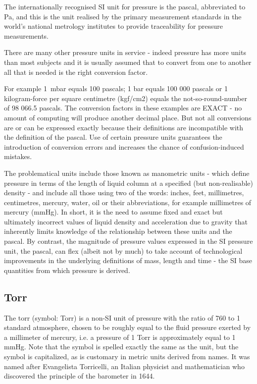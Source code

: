 \documentclass{tufte-book}
\begin{document}
The internationally recognised SI unit for pressure is the pascal, abbreviated to Pa, and this is the unit realised by the primary measurement standards in the world's national metrology institutes to provide traceability for pressure measurements.

There are many other pressure units in service - indeed pressure has more units than most subjects and it is usually assumed that to convert from one to another all that is needed is the right conversion factor. 

For example \SI{1}{mbar} equals 100 pascals; 1 bar equals 100 000 pascals or 1 kilogram-force per square centimetre (kgf/cm2) equals the not-so-round-number of 98 066.5 pascals. The conversion factors in these examples are EXACT - no amount of computing will produce another decimal place. But not all conversions are or can be expressed exactly because their definitions are incompatible with the definition of the pascal. Use of certain pressure units guarantees the introduction of conversion errors and increases the chance of confusion-induced mistakes.



The problematical units include those known as manometric units - which define pressure in terms of the length of liquid column at a specified (but non-realisable) density - and include all those using two of the words: inches, feet, millimetres, centimetres, mercury, water, oil or their abbreviations, for example millimetres of mercury (mmHg). In short, it is the need to assume fixed and exact but ultimately incorrect values of liquid density and acceleration due to gravity that inherently limits knowledge of the relationship between these units and the pascal. By contrast, the magnitude of pressure values expressed in the SI pressure unit, the pascal, can flex (albeit not by much) to take account of technological improvements in the underlying definitions of mass, length and time - the SI base quantities from which pressure is derived.




\subsection{Torr}

The torr (symbol: Torr) is a non-SI unit of pressure with the ratio of 760 to 1 standard atmosphere, chosen to be roughly equal to the fluid pressure exerted by a millimeter of mercury, i.e. a pressure of 1 Torr is approximately equal to 1 mmHg. Note that the symbol is spelled exactly the same as the unit, but the symbol is capitalized, as is customary in metric units derived from names. It was named after Evangelista Torricelli, an Italian physicist and mathematician who discovered the principle of the barometer in 1644.
\end{document}
